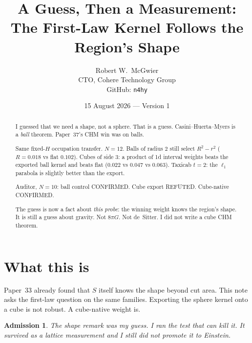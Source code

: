 \documentclass[11pt]{article}
\title{\textbf{A Guess, Then a Measurement:\\
The First-Law Kernel Follows the Region's Shape}}
\author{Robert W.\ McGwier\\
\small CTO, Cohere Technology Group\\
\small GitHub: \texttt{n4hy}}
\date{15 August 2026 --- Version 1}
\newtheorem*{admission}{Admission}
\begin{document}
\maketitle

\begin{abstract}
\noindent
I guessed that we need a shape, not a sphere. That is a
guess. Casini--Huerta--Myers is a \emph{ball} theorem.
Paper~37's CHM win was on balls.

Same fixed-$H$ occupation transfer. $N=12$. Balls of
radius $2$ still select $R^2-r^2$ ($R=0.018$ vs flat
$0.102$). Cubes of side $3$: a product of 1d interval
weights beats the exported ball kernel and beats flat
($0.022$ vs $0.047$ vs $0.063$). Taxicab $t=2$: the
$\ell_1$ parabola is slightly better than the export.

Auditor, $N=10$: ball control CONFIRMED. Cube export
REFUTED. Cube-native CONFIRMED.

The guess is now a fact about \emph{this probe}: the
winning weight knows the region's shape. It is still a
guess about gravity. Not $8\pi G$. Not de~Sitter. I did
not write a cube CHM theorem.
\end{abstract}

\section{What this is}

Paper~33 already found that $S$ itself knows the shape
beyond cut area. This note asks the first-law question
on the same families. Exporting the sphere kernel onto
a cube is not robust. A cube-native weight is.

\begin{admission}
The shape remark was my guess. I ran the test that can
kill it. It survived as a lattice measurement and I
still did not promote it to Einstein.
\end{admission}
\end{document}
